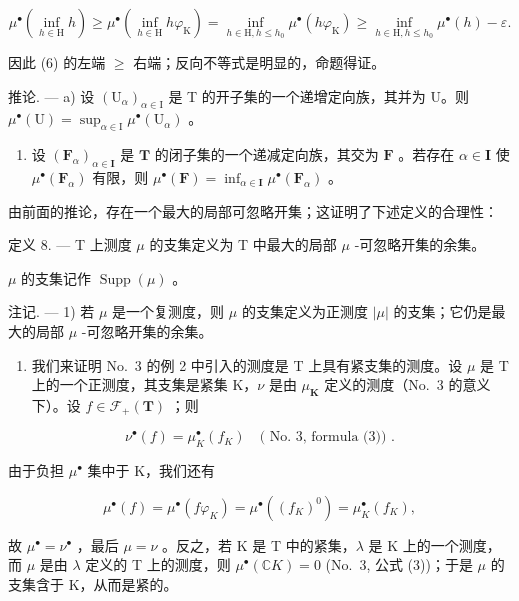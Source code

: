 \[
\mu^ {\bullet} \left(\inf _ {h \in \mathrm{H}} h\right) \geqslant \mu^ {\bullet} \left(\inf _ {h \in \mathrm{H}} h \varphi_ {\mathrm{K}}\right) = \inf _ {h \in \mathrm{H}, h \leqslant h _ {0}} \mu^ {\bullet} (h \varphi_ {\mathrm{K}}) \geqslant \inf _ {h \in \mathrm{H}, h \leqslant h _ {0}} \mu^ {\bullet} (h) - \varepsilon .
\]

因此 (6) 的左端 \(\geqslant\) 右端；反向不等式是明显的，命题得证。

推论. --- a) 设 \((\mathrm{U}_{\alpha})_{\alpha \in \mathrm{I}}\) 是 T 的开子集的一个递增定向族，其并为 U。则 \(\mu^{\bullet}(\mathrm{U}) = \sup_{\alpha \in \mathrm{I}} \mu^{\bullet}(\mathrm{U}_{\alpha})\) 。

\begin{enumerate}
\def\labelenumi{\alph{enumi})}
\setcounter{enumi}{1}
\tightlist
\item
  设 \((\mathbf{F}_{\alpha})_{\alpha \in \mathbf{I}}\) 是 \(\mathbf{T}\) 的闭子集的一个递减定向族，其交为 \(\mathbf{F}\) 。若存在 \(\alpha \in \mathbf{I}\) 使 \(\mu^{\bullet}(\mathbf{F}_{\alpha})\) 有限，则 \(\mu^{\bullet}(\mathbf{F}) = \inf_{\alpha \in \mathbf{I}} \mu^{\bullet}(\mathbf{F}_{\alpha})\) 。
\end{enumerate}

由前面的推论，存在一个最大的局部可忽略开集；这证明了下述定义的合理性：

定义 8. --- T 上测度 \(\mu\) 的支集定义为 T 中最大的局部 \(\mu\) -可忽略开集的余集。

\(\mu\) 的支集记作 \(\operatorname{Supp}(\mu)\) 。

注记. --- 1) 若 \(\mu\) 是一个复测度，则 \(\mu\) 的支集定义为正测度 \(|\mu|\) 的支集；它仍是最大的局部 \(\mu\) -可忽略开集的余集。

\begin{enumerate}
\def\labelenumi{\arabic{enumi})}
\setcounter{enumi}{1}
\tightlist
\item
  我们来证明 No.~3 的例 2 中引入的测度是 T 上具有紧支集的测度。设 \(\mu\) 是 T 上的一个正测度，其支集是紧集 K，\(\nu\) 是由 \(\mu_{\mathbf{K}}\) 定义的测度（No.~3 的意义下）。设 \(f \in \mathcal{F}_{+}(\mathbf{T})\) ；则
\end{enumerate}

\[
\nu^ {\bullet} (f) = \mu_ {K} ^ {\bullet} (f _ {K}) \quad (\text { No.   3,   formula   (3)) }.
\]

由于负担 \(\mu^{\bullet}\) 集中于 K，我们还有

\[
\mu^ {\bullet} (f) = \mu^ {\bullet} (f \varphi_ {K}) = \mu^ {\bullet} ((f _ {K}) ^ {0}) = \mu_ {K} ^ {\bullet} (f _ {K}),
\]

故 \(\mu^{\bullet} = \nu^{\bullet}\) ，最后 \(\mu = \nu\) 。反之，若 K 是 T 中的紧集，\(\lambda\) 是 K 上的一个测度，而 \(\mu\) 是由 \(\lambda\) 定义的 T 上的测度，则 \(\mu^{\bullet}(\mathbb{C}K) = 0\) (No.~3, 公式 (3))；于是 \(\mu\) 的支集含于 K，从而是紧的。

